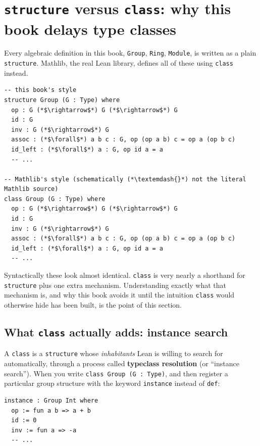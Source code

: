 \section{\texorpdfstring{\texttt{structure} versus \texttt{class}: why this book delays type classes}{structure versus class: why this book delays type classes}}\label{sec:05-rigor-check:01-structure-vs-class:1}

Every algebraic definition in this book, \texttt{Group}, \texttt{Ring}, \texttt{Module}, is written as a plain \texttt{structure}. Mathlib, the real Lean library, defines all of these using \texttt{class} instead.

\begin{lstlisting}
-- this book's style
structure Group (G : Type) where
  op : G (*$\rightarrow$*) G (*$\rightarrow$*) G
  id : G
  inv : G (*$\rightarrow$*) G
  assoc : (*$\forall$*) a b c : G, op (op a b) c = op a (op b c)
  id_left : (*$\forall$*) a : G, op id a = a
  -- ...

-- Mathlib's style (schematically (*\textemdash{}*) not the literal Mathlib source)
class Group (G : Type) where
  op : G (*$\rightarrow$*) G (*$\rightarrow$*) G
  id : G
  inv : G (*$\rightarrow$*) G
  assoc : (*$\forall$*) a b c : G, op (op a b) c = op a (op b c)
  id_left : (*$\forall$*) a : G, op id a = a
  -- ...
\end{lstlisting}

Syntactically these look almost identical. \texttt{class} is very nearly a shorthand for \texttt{structure} plus one extra mechanism. Understanding exactly what that mechanism is, and why this book avoids it until the intuition \texttt{class} would otherwise hide has been built, is the point of this section.

\subsection{\texorpdfstring{What \texttt{class} actually adds: instance search}{What class actually adds: instance search}}\label{sec:05-rigor-check:01-structure-vs-class:2}

A \texttt{class} is a \texttt{structure} whose \emph{inhabitants} Lean is willing to search for automatically, through a process called \textbf{typeclass resolution} (or ``instance search''). When you write \texttt{class Group (G : Type)}, and then register a particular group structure with the keyword \texttt{instance} instead of \texttt{def}:

\begin{lstlisting}
instance : Group Int where
  op := fun a b => a + b
  id := 0
  inv := fun a => -a
  -- ...
\end{lstlisting}


